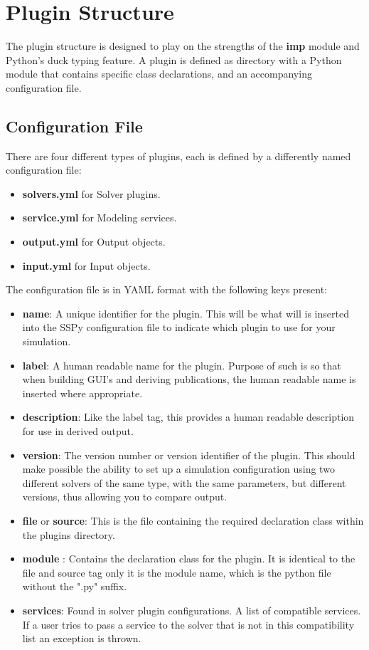 \documentclass[12pt]{article}
\begin{document}
\section*{Plugin Structure}

The plugin structure is designed to play on the strengths of the {\bf imp} module and Python's duck typing feature. A plugin is defined as directory with a Python module that contains specific class declarations, and an accompanying configuration file. 

\subsection*{Configuration File}

There are four different types of plugins, each is defined by a differently named configuration file:

\begin{itemize}
	\item[] {\bf solvers.yml} for Solver plugins.
	\item[] {\bf service.yml} for Modeling services.
	\item[] {\bf output.yml} for Output objects.
	\item[] {\bf input.yml} for Input objects.
\end{itemize}

The configuration file is in YAML format with the following keys present:

\begin{itemize}
	\item[] {\bf name}: A unique identifier for the plugin. This will be what will is inserted into the SSPy configuration file to indicate which plugin to use for your simulation.
	\item[] {\bf label}: A human readable name for the plugin. Purpose of such is so that when building GUI's and deriving publications, the human readable name is inserted where appropriate. 
	\item[] {\bf description}: Like the label tag, this provides a human readable description for use in derived output.
	\item[] {\bf version}: The version number or version identifier of the plugin. This should make possible the ability to set up a simulation configuration using two different solvers of the same type, with the same parameters, but different versions, thus allowing you to compare output.
	\item[] {\bf file} or {\bf source}: This is the file containing the required declaration class within the plugins directory. 
	\item[] {\bf module} : Contains the declaration class for the plugin. It is identical to the file and source tag only it is the module name, which is the python file without the ".py" suffix.
	\item[]{\bf services}: Found in solver plugin configurations. A list of compatible services. If a user tries to pass a service to the solver that is not in this compatibility list an exception is thrown. 
\end{itemize}
\end{document}
